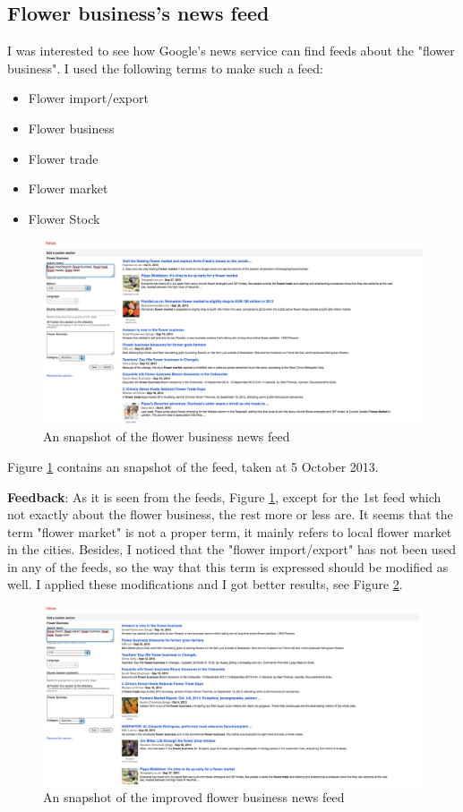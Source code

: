 \documentclass[10pt]{article}
\begin{document}
\subsection{Flower business's news feed}
I was interested to see how Google's news service can find feeds about the "flower business". I used the following terms to make such a feed:

\begin{itemize}
\item{Flower import/export}
\item{Flower business}
\item{Flower trade}
\item{Flower market}
\item{Flower Stock}
\end{itemize}

\begin{figure}[h]
\begin{center}
    \centering 
    \includegraphics[scale=.52]{pic4.png}
    \caption{An snapshot of the flower business news feed}
    \label{flowerBusiness} 
\end{center}
\end{figure}

Figure \ref{flowerBusiness} contains an snapshot of the feed, taken at 5 October 2013.

\textbf{Feedback}: As it is seen from the feeds, Figure \ref{flowerBusiness}, except for the 1st feed which not exactly about the flower business, the rest more or less are. It seems that the term "flower market" is not a proper term, it mainly refers to local flower market in the cities. Besides, I noticed that the "flower import/export" has not been used in any of the feeds, so the way that this term is expressed should be modified as well. I applied these modifications and I got better results, see Figure \ref{flowerBusinessBetter}.

\begin{figure}[h]
\begin{center}
    \centering 
    \includegraphics[scale=.52]{pic5.png}
    \caption{An snapshot of the improved flower business news feed}
    \label{flowerBusinessBetter} 
\end{center}
\end{figure}
\end{document}
